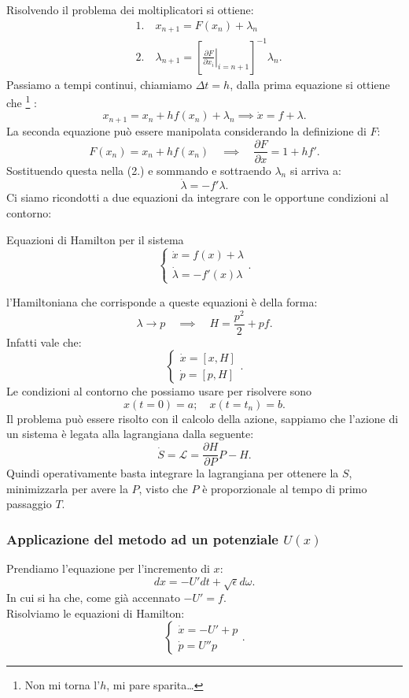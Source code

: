 Risolvendo il problema dei moltiplicatori si ottiene:
\[\begin{aligned}
    &1. \quad x_{n+1} = F(x_n) + \lambda_n\\
    &2. \quad \lambda_{n+1}=\left[\left.\frac{\partial F}{\partial x_i} \right|_{i = n+1}\right]^{-1}\lambda_n
.\end{aligned}\]
Passiamo a tempi continui, chiamiamo $\Delta t = h$, dalla prima equazione si ottiene che
\footnote{Non mi torna l'$h$, mi pare sparita\ldots}
:
\[
    x_{n+1} = x_n + h f(x_n) + \lambda_n \implies  \dot{x} = f + \lambda
.\] 
La seconda equazione può essere manipolata considerando la definizione di $F$:
\[
    F(x_n) = x_n+hf(x_n) \quad \implies  \quad  \frac{\partial F}{\partial x} = 1+hf'
.\] 
Sostituendo questa nella (2.) e sommando e sottraendo $\lambda_n$ si arriva a:
\[
    \dot{\lambda} =  - f'\lambda
.\] 
Ci siamo ricondotti a due equazioni da integrare con le opportune condizioni al contorno:
\begin{redbox}{Equazioni di Hamilton per il sistema}
\[
    \begin{cases}
	\dot{x} = f(x) + \lambda\\
	\dot{\lambda } = - f'(x) \lambda
    \end{cases}
.\]     
\end{redbox}
\noindent
l'Hamiltoniana che corrisponde a queste equazioni è della forma:
\[
    \lambda  \to p \quad \implies  \quad H = \frac{p^2}{2} + pf
.\] 
Infatti vale che:
\[
    \begin{cases}
	\dot{x} = \left[x,H\right]\\
	\dot{p} = \left[p,H\right]
    \end{cases}
.\] 
Le condizioni al contorno che possiamo usare per risolvere sono 
\[
    x(t=0) = a; \quad x(t = t_n) = b
.\] 
Il problema può essere risolto con il calcolo della azione, sappiamo che l'azione di un sistema è legata alla lagrangiana dalla seguente:
\[
    \dot{S} = \mathcal{L} = \frac{\partial H}{\partial P} P - H
.\] 
Quindi operativamente basta integrare la lagrangiana per ottenere la $S$, minimizzarla per avere la $P$, visto che $P$ è proporzionale al tempo di primo passaggio $T$. 
\subsubsection{Applicazione del metodo ad un potenziale $U(x)$}%
\label{subsub:Applicazione del metodo ad un potenziale $U(x)$}
Prendiamo l'equazione per l'incremento di $x$:
\[
    dx = - U' dt + \sqrt{\epsilon} d\omega
.\] 
In cui si ha che, come già accennato $-U' = f$.\\
Risolviamo le equazioni di Hamilton:
\[
    \begin{cases}
	\dot{x} = -U' + p\\
	\dot{p} = U''p
    \end{cases}
.\] 

